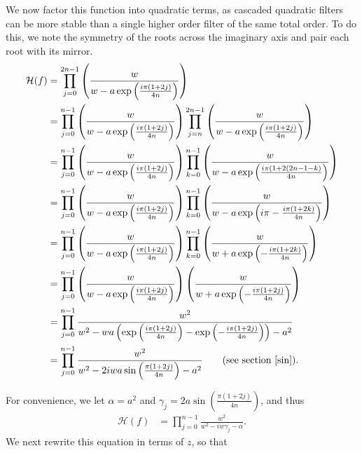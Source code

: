\documentclass[a4paper]{article}
\begin{document}
We now factor this function into quadratic terms, as cascaded quadratic filters
can be more stable than a single higher order filter of the same total order.
To do this, we note the symmetry of the roots across the imaginary axis and
pair each root with its mirror.
\begin{align}
    \mathcal{H}(f) &= \prod_{j=0}^{2 n - 1} \left(\frac{w}{w - a\exp\left(\frac{i \pi (1 + 2 j)}{4 n}\right)}\right) \\
        &= \prod_{j=0}^{n - 1} \left(\frac{w}{w - a\exp\left(\frac{i \pi (1 + 2 j)}{4 n}\right)}\right)
           \prod_{j=n}^{2 n - 1} \left(\frac{w}{w - a\exp\left(\frac{i \pi (1 + 2 j)}{4 n}\right)}\right) \\
        &= \prod_{j=0}^{n - 1} \left(\frac{w}{w - a\exp\left(\frac{i \pi (1 + 2 j)}{4 n}\right)}\right)
           \prod_{k=0}^{n - 1} \left(\frac{w}{w - a\exp\left(\frac{i \pi (1 + 2 (2 n - 1 - k)}{4 n}\right)}\right) \\
        &= \prod_{j=0}^{n - 1} \left(\frac{w}{w - a\exp\left(\frac{i \pi (1 + 2 j)}{4 n}\right)}\right)
           \prod_{k=0}^{n - 1} \left(\frac{w}{w - a\exp\left(i \pi-\frac{i \pi (1 + 2 k)}{4 n}\right)}\right) \\
        &= \prod_{j=0}^{n - 1} \left(\frac{w}{w - a\exp\left(\frac{i \pi (1 + 2 j)}{4 n}\right)}\right)
           \prod_{k=0}^{n - 1} \left(\frac{w}{w + a\exp\left(-\frac{i \pi (1 + 2 k)}{4 n}\right)}\right) \\
        &= \prod_{j=0}^{n - 1}
           \left(\frac{w}{w - a\exp\left(\frac{i \pi (1 + 2 j)}{4 n}\right)}\right)
           \left(\frac{w}{w + a\exp\left(-\frac{i \pi (1 + 2 j)}{4 n}\right)}\right) \\
        &= \prod_{j=0}^{n - 1}
           \frac{w^2}{w^2 - w a \left(\exp\left(\frac{i \pi (1 + 2 j)}{4 n}\right) -
           \exp\left(-\frac{i \pi (1 + 2 j)}{4 n}\right)\right) - a^2} \label{eq:high_pass_quadratic1} \\
        &= \prod_{j=0}^{n - 1}
           \frac{w^2}{w^2 - 2 i w a \sin\left(\frac{\pi (1 + 2 j)}{4 n}\right) - a^2} \qquad\textrm{(see section \ref{sin})}. \label{eq:high_pass_quadratic2}
\end{align}


For convenience, we let $\alpha = a^2$ and $\gamma_j = 2 a \sin\left(\frac{\pi (1 + 2 j)}{4 n}\right)$, and thus 
\begin{align}
    \mathcal{H}(f) &= \prod_{j=0}^{n - 1}\frac{w^2}
        {w^2 - i w \gamma_j - \alpha}\label{eq:highpass_before_z}.
\end{align}
We next rewrite this equation in terms of $z$, so that
\end{document}
